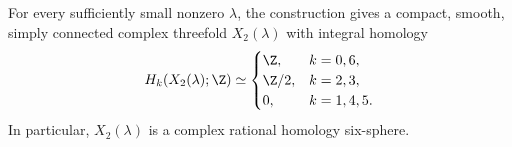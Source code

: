 \begin{theorem}\label{intro:main}
For every sufficiently small nonzero $\lambda$, the construction gives
a compact, smooth, simply connected complex threefold $X_2(\lambda)$
with integral homology
\[
 H_k(X_2(\lambda);\Z)\simeq
 \begin{cases}
 \Z,&k=0,6,\\
 \Z/2,&k=2,3,\\
 0,&k=1,4,5.
 \end{cases}
\]
In particular, $X_2(\lambda)$ is a complex rational homology six-sphere.
\end{theorem}
